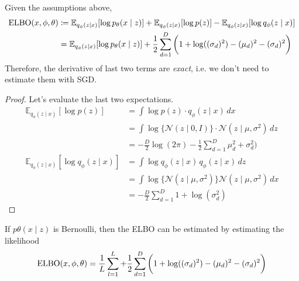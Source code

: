   \begin{theorem}
    \label{thm:the-evidence-lower-bound}
    Given the assumptions above, 
    \begin{align}
      \operatorname{ELBO}(x, \phi, \theta) & \coloneqq \mathbb{E}_{q_\phi(z \mid x)} [ \log p_\theta (x \mid z)] + \mathbb{E}_{q_\phi (z \mid x)} [ \log p(z)] - \mathbb{E}_{q_\phi (z \mid x)} [ \log q_\phi (z \mid x)] \\
                             & = \mathbb{E}_{q_\phi(z \mid x)} [ \log p_\theta (x \mid z)] + \frac{1}{2} \sum_{d=1}^D \bigg( 1 + \log( (\sigma_d)^2 ) - (\mu_d)^2 - (\sigma_d)^2 \bigg)
    \end{align}
    Therefore, the derivative of last two terms are \textit{exact}, i.e. we don't need to estimate them with SGD. 
  \end{theorem}
  \begin{proof}
    Let's evaluate the last two expectations. 
    \begin{align}
      \mathbb{E}_{q_\phi (z \mid x)} [ \log p(z)] & = \int \log p(z) \cdot q_\phi (z \mid x) \,dx \\
                                                  & = \int \log \{\mathcal{N} (z \mid 0, I) \}  \cdot \mathcal{N}(z \mid \mu, \sigma^2) \,dz  \\
                                                  & = - \frac{D}{2} \log (2 \pi) - \frac{1}{2} \sum_{d=1}^D \mu_d^2 + \sigma_d^2) \\
      \mathbb{E}_{q_\phi (z \mid x)} [ \log q_\phi (z \mid x)] & = \int \log q_\phi (z \mid x) \, q_\phi (z \mid x) \,dz \\
                                                               & = \int \log \{ \mathcal{N}(z \mid \mu, \sigma^2) \} \mathcal{N}(z \mid \mu, \sigma^2) \,dx \\
                                                               & = -\frac{D}{2} \sum_{d=1}^D 1 + \log (\sigma_d^2)
    \end{align}
  \end{proof} 

  \begin{corollary}
    \label{thm:bernoulli-likelihood}
    If $p\theta (x \mid z)$ is Bernoulli, then the ELBO can be estimated by estimating the likelihood 
    \begin{equation}
      \operatorname{ELBO}(x, \phi, \theta) = \frac{1}{L} \sum_{l=1}^L + \frac{1}{2} \sum_{d=1}^D \bigg( 1 + \log( (\sigma_d)^2 ) - (\mu_d)^2 - (\sigma_d)^2 \bigg)
    \end{equation}
  \end{corollary}


